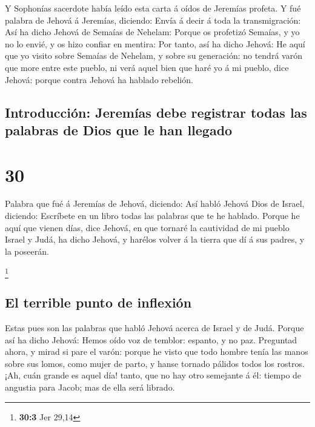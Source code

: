  Y Sophonías sacerdote había leído esta carta á oídos de
Jeremías profeta.  Y fué palabra de Jehová á Jeremías,
diciendo:  Envía á decir á toda la transmigración: Así ha
dicho Jehová de Semaías de Nehelam: Porque os profetizó Semaías, y yo no
lo envié, y os hizo confiar en mentira:  Por tanto, así ha
dicho Jehová: He aquí que yo visito sobre Semaías de Nehelam, y sobre su
generación: no tendrá varón que more entre este pueblo, ni verá aquel
bien que haré yo á mi pueblo, dice Jehová: porque contra Jehová ha
hablado rebelión.

\hypertarget{introducciuxf3n-jeremuxedas-debe-registrar-todas-las-palabras-de-dios-que-le-han-llegado}{%
\subsection{Introducción: Jeremías debe registrar todas las palabras de
Dios que le han
llegado}\label{introducciuxf3n-jeremuxedas-debe-registrar-todas-las-palabras-de-dios-que-le-han-llegado}}

\hypertarget{section-29}{%
\section{30}\label{section-29}}

 Palabra que fué á Jeremías de Jehová, diciendo:
 Así habló Jehová Dios de Israel, diciendo: Escríbete en un
libro todas las palabras que te he hablado.  Porque he aquí
que vienen días, dice Jehová, en que tornaré la cautividad de mi pueblo
Israel y Judá, ha dicho Jehová, y harélos volver á la tierra que dí á
sus padres, y la poseerán.

\footnote{\textbf{30:3} Jer 29,14}

\hypertarget{el-terrible-punto-de-inflexiuxf3n}{%
\subsection{El terrible punto de
inflexión}\label{el-terrible-punto-de-inflexiuxf3n}}

 Estas pues son las palabras que habló Jehová acerca de
Israel y de Judá.  Porque así ha dicho Jehová: Hemos oído
voz de temblor: espanto, y no paz.  Preguntad ahora, y mirad
si pare el varón: porque he visto que todo hombre tenía las manos sobre
sus lomos, como mujer de parto, y hanse tornado pálidos todos los
rostros.  ¡Ah, cuán grande es aquel día! tanto, que no hay
otro semejante á él: tiempo de angustia para Jacob; mas de ella será
librado.

